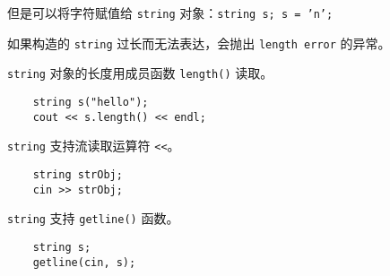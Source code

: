 \documentclass[UTF8]{ctexart}
\begin{document}
但是可以将字符赋值给 \texttt{string} 对象：\texttt{string s; s = 'n';}

如果构造的 \texttt{string} 过长而无法表达，会抛出 \texttt{length error} 的异常。

\texttt{string} 对象的长度用成员函数 \texttt{length()} 读取。
\begin{verbatim}
    string s("hello");
    cout << s.length() << endl;
\end{verbatim}

\texttt{string} 支持流读取运算符 \texttt{<<}。
\begin{verbatim}
    string strObj;
    cin >> strObj;
\end{verbatim}

\texttt{string} 支持 \texttt{getline()} 函数。
\begin{verbatim}
    string s;
    getline(cin, s);
\end{verbatim}
\end{document}
